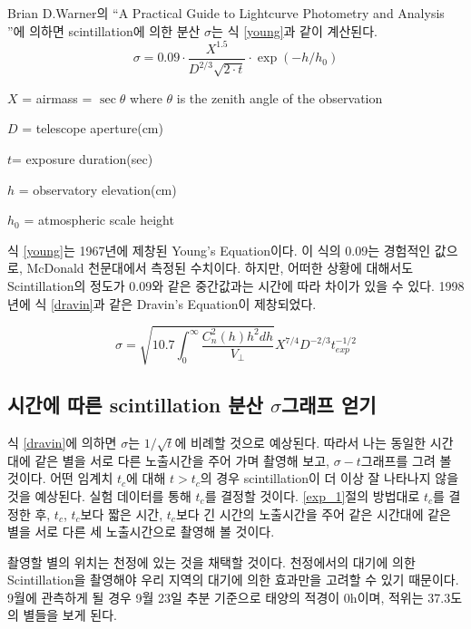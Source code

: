 \documentclass[11pt]{article}
\begin{document}
	Brian D.Warner의 \textquotedblleft A Practical Guide to Lightcurve Photometry and Analysis \textquotedblright 에 의하면 scintillation에 의한 분산 $\sigma$는 식 \ref{young}과 같이 계산된다.
	\begin{equation} \label{young}
	\sigma = 0.09 \cdot \frac{X^{1.5}}{D^{2/3}\sqrt{2\cdot t}} \cdot \exp{(-h/h_0)}
	\end{equation}
	
	$X$ = airmass = $\sec{\theta}$ where $\theta$ is the zenith angle of the observation
	
	$D$ = telescope aperture(cm)
	
	$t$= exposure duration(sec)
	
	$h$ = observatory elevation(cm)
	
	$h_0$ = atmospheric scale height
	
	식 \ref{young}는 1967년에 제창된 Young's Equation이다. 이 식의 0.09는 경험적인 값으로, McDonald 천문대에서 측정된 수치이다. 하지만, 어떠한 상황에 대해서도 Scintillation의 정도가 0.09와 같은 중간값과는 시간에 따라 차이가 있을 수 있다.\cite{Osborn} 1998년에 식 \ref{dravin}과 같은 Dravin's Equation이 제창되었다.
	
	\begin{equation} \label{dravin}
	\sigma = \sqrt{ 10.7\int_{0}^{\infty}{ \frac{C_n^2(h)h^2dh}{V_\perp} } } X^{7/4}D^{-2/3}t_{exp}^{-1/2}
	\end{equation}
	
	\subsection{시간에 따른 scintillation 분산 $\sigma$그래프 얻기}
	
	식 \ref{dravin}에 의하면 $\sigma$는 $1/\sqrt{t}$에 비례할 것으로 예상된다. 따라서 나는 동일한 시간대에 같은 별을 서로 다른 노출시간을 주어 가며 촬영해 보고, $\sigma - t$그래프를 그려 볼 것이다.
	어떤 임계치 $t_c$에 대해 $t>t_c$의 경우 scintillation이 더 이상 잘 나타나지 않을 것을 예상된다. 실험 데이터를 통해 $t_c$를 결정할 것이다.
	\ref{exp_1}절의 방법대로 $t_c$를 결정한 후, $t_c$, $t_c$보다 짧은 시간, $t_c$보다 긴 시간의 노출시간을 주어 같은 시간대에 같은 별을 서로 다른 세 노출시간으로 촬영해 볼 것이다.
	
	촬영할 별의 위치는 천정에 있는 것을 채택할 것이다. 천정에서의 대기에 의한 Scintillation을 촬영해야 우리 지역의 대기에 의한 효과만을 고려할 수 있기 때문이다.
	9월에 관측하게 될 경우 9월 23일 추분 기준으로 태양의 적경이 0h이며, 적위는 37.3도의 별들을 보게 된다.
	
\end{document}
